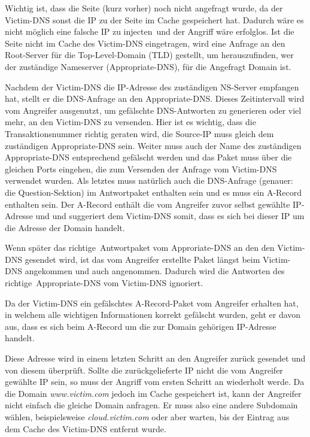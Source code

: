 \documentclass[10pt,a4paper]{article}
\begin{document}
Wichtig ist, dass die Seite (kurz vorher) noch nicht angefragt wurde, da der Victim-DNS sonst die IP zu der Seite im Cache gespeichert hat. Dadurch wäre es nicht möglich eine falsche IP  zu \glqq injecten\grqq\ und der Angriff wäre erfolglos. Ist die Seite nicht im Cache des Victim-DNS eingetragen, wird eine Anfrage an den Root-Server für die Top-Level-Domain (TLD) gestellt, um herauszufinden, wer der zuständige Nameserver (Appropriate-DNS), für die Angefragt Domain ist.

Nachdem der Victim-DNS die IP-Adresse des zuständigen NS-Server empfangen hat, stellt er die DNS-Anfrage an den Appropriate-DNS. Dieses Zeitintervall wird vom Angreifer ausgenutzt, um gefälschte DNS-Antworten zu generieren oder viel mehr, an den Victim-DNS zu versenden. Hier ist es wichtig, dass die Transaktionsnummer richtig geraten wird, die Source-IP muss gleich dem zuständigen Appropriate-DNS sein. Weiter muss auch der Name des zuständigen Appropriate-DNS entsprechend gefälscht werden und das Paket muss über die gleichen Ports eingehen, die zum Versenden der Anfrage vom Victim-DNS verwendet wurden. Als letztes muss natürlich auch die DNS-Anfrage (genauer: die Question-Sektion) im Antwortpaket enthalten sein und es muss ein A-Record enthalten sein. Der A-Record enthält die vom Angreifer zuvor selbst gewählte IP-Adresse und und suggeriert dem Victim-DNS somit, dass es sich bei dieser IP um die Adresse der Domain handelt.

Wenn später das \glqq richtige\grqq\ Antwortpaket vom Approriate-DNS an den den Victim-DNS gesendet wird, ist das vom Angreifer erstellte Paket längst beim Victim-DNS angekommen und auch angenommen. Dadurch wird die Antworten des \glqq richtige\grqq\ Appropriate-DNS vom Victim-DNS ignoriert. 

Da der Victim-DNS ein gefälschtes A-Record-Paket vom Angreifer erhalten hat, in welchem alle wichtigen Informationen korrekt gefälscht wurden, geht er davon aus, dass es sich beim A-Record um die zur Domain gehörigen IP-Adresse handelt.

Diese Adresse wird in einem letzten Schritt an den Angreifer zurück gesendet und von diesem überprüft. Sollte die zurückgelieferte IP nicht die vom Angreifer gewählte IP sein, so muss der Angriff vom ersten Schritt an wiederholt werde. Da die Domain \emph{www.victim.com} jedoch im Cache gespeichert ist, kann der Angreifer nicht einfach die gleiche Domain anfragen. Er muss also eine andere Subdomain wählen, beispielsweise \emph{cloud.victim.com} oder aber warten, bis der Eintrag aus dem Cache des Victim-DNS entfernt wurde.
\end{document}
